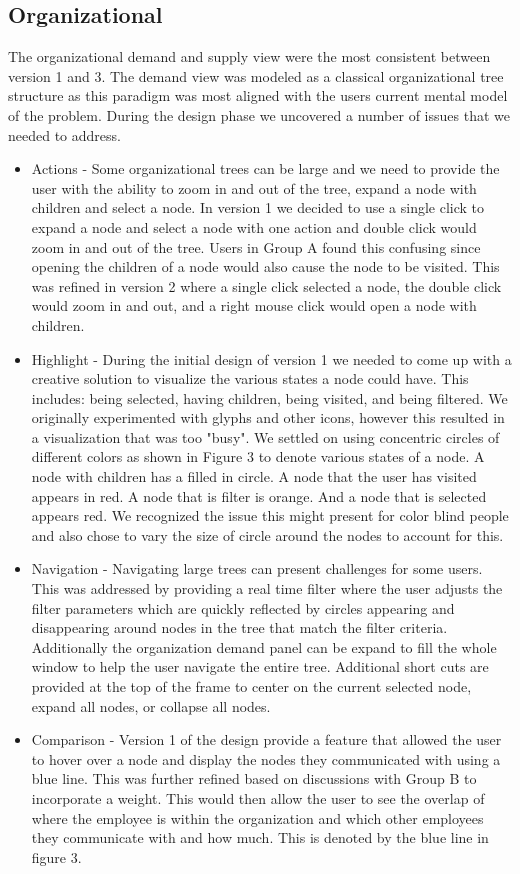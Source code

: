 \documentclass[journal]{vgtc}                %
\begin{document}
\subsection{Organizational}
The organizational demand and supply view were the most consistent between version 1 and 3.  The demand view was modeled as a classical organizational tree structure as this paradigm was most aligned with the users current mental model of the problem.  During the design phase we uncovered a number of issues that we needed to address.
\begin{itemize}
	\item Actions - Some organizational trees can be large and we need to provide the user with the ability to zoom in and out of the tree, expand a node with children and select a node.  In version 1 we decided to use a single click to expand a node and select a node with one action and double click would zoom in and out of the tree.  Users in Group A found this confusing since opening the children of a node would also cause the node to be visited.  This was refined in version 2 where a single click selected a node, the double click would zoom in and out, and a right mouse click would open a node with children.  
	\item Highlight - During the initial design of version 1 we needed to come up with a creative solution to visualize the various states a node could have.  This includes: being selected, having children, being visited, and being filtered.  We originally experimented with glyphs and other icons, however this resulted in a visualization that was too "busy".  We settled on using concentric circles of different colors as shown in Figure 3 to denote various states of a node.  A node with children has a filled in circle.  A node that the user has visited appears in red.  A node that is filter is orange. And a node that is selected appears red.  We recognized the issue this might present for color blind people and also chose to vary the size of circle around the nodes to account for this.
	\item Navigation - Navigating large trees can present challenges for some users.  This was addressed by providing a real time filter where the user adjusts the filter parameters which are quickly reflected by circles appearing and disappearing around nodes in the tree that match the filter criteria.  Additionally the organization demand panel can be expand to fill the whole window to help the user navigate the entire tree.  Additional short cuts are provided at the top of the frame to center on the current selected node, expand all nodes, or collapse all nodes.
	\item Comparison - Version 1 of the design provide a feature that allowed the user to hover over a node and display the nodes they communicated with using a blue line.  This was further refined based on discussions with Group B to incorporate a weight.  This would then allow the user to see the overlap of where the employee is within the organization and which other employees they communicate with and how much.  This is denoted by the blue line in figure 3.
\end{itemize}
\end{document}

